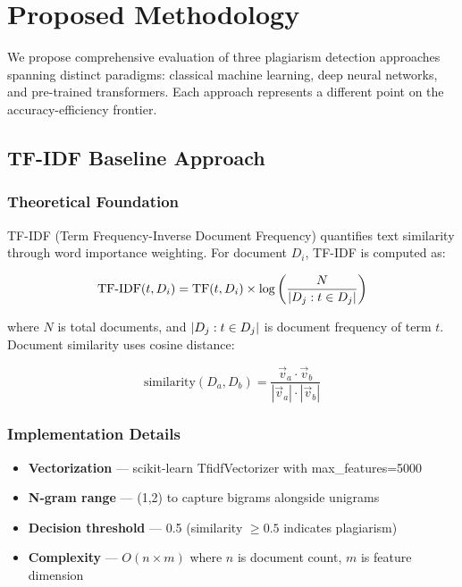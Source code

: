 \section{Proposed Methodology} \label{sec:methodology}

We propose comprehensive evaluation of three plagiarism detection approaches spanning distinct paradigms: classical machine learning, deep neural networks, and pre-trained transformers. Each approach represents a different point on the accuracy-efficiency frontier.

\subsection{TF-IDF Baseline Approach}

\subsubsection{Theoretical Foundation}

TF-IDF (Term Frequency-Inverse Document Frequency) quantifies text similarity through word importance weighting. For document $D_i$, TF-IDF is computed as:

\begin{equation}
\text{TF-IDF}(t, D_i) = \text{TF}(t, D_i) \times \log\left(\frac{N}{|\\{D_j : t \in D_j\\}|}\right)
\end{equation}

where $N$ is total documents, and $|\\{D_j : t \in D_j\\}|$ is document frequency of term $t$. Document similarity uses cosine distance:

\begin{equation}
\text{similarity}(D_a, D_b) = \frac{\vec{v}_a \cdot \vec{v}_b}{|\vec{v}_a| \cdot |\vec{v}_b|}
\end{equation}

\subsubsection{Implementation Details}

\begin{itemize}
  \item \textbf{Vectorization} --- scikit-learn TfidfVectorizer with max\_features=5000
  \item \textbf{N-gram range} --- (1,2) to capture bigrams alongside unigrams
  \item \textbf{Decision threshold} --- 0.5 (similarity $\geq 0.5$ indicates plagiarism)
  \item \textbf{Complexity} --- $O(n \times m)$ where $n$ is document count, $m$ is feature dimension
\end{itemize}

